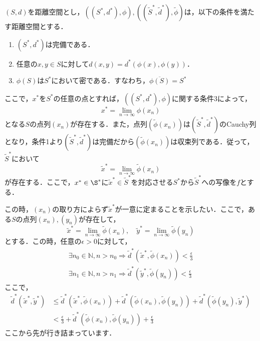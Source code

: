 \documentclass[12pt]{jarticle}
\numberwithin{equation}{section}    %
\numberwithin{figure}{section}      %
\numberwithin{table}{section}      %
\begin{document}
$(S, d)$を距離空間とし，$((S^{\ast}, d^{\ast}), \phi), ((\tilde{S}^{\ast}, \tilde{d}^{\ast}), \tilde{\phi})$は，以下の条件を満たす距離空間とする．
\begin{enumerate}
    \item $(S^{\ast}, d^{\ast})$は完備である．
    \item 任意の$x, y \in S$に対して$d(x, y) = d^{\ast}(\phi(x), \phi(y))$．
    \item $\phi(S)$は$S^{\ast}$において密である．すなわち，$\overline{\phi(S)} = S^{\ast}$
\end{enumerate}
ここで，$x^{\ast}$を$S^{\ast}$の任意の点とすれば，$((S^{\ast}, d^{\ast}), \phi)$に関する条件3によって，
\begin{equation}
    x^{\ast} = \lim_{n \to \infty} \phi(x_{n})
\end{equation}
となる$S$の点列$(x_{n})$が存在する．また，点列$(\tilde{\phi}(x_{n}))$は$(\tilde{S}^{\ast}, \tilde{d}^{\ast})$のCauchy列となり，条件1より$(\tilde{S}^{\ast}, \tilde{d}^{\ast})$は完備だから$(\tilde{\phi}(x_{n}))$は収束列である．従って，$\tilde{S}^{\ast}$において
\begin{equation}
    \tilde{x}^{\ast} = \lim_{n \to \infty} \tilde{\phi}(x_{n})
\end{equation}
が存在する．ここで，$x^{\ast} \in \S^{\ast}$に$\tilde{x}^{\ast} \in \tilde{S}^{\ast}$を対応させる$S^{\ast}$から$\tilde{S}^{\ast}$への写像を$f$とする．

この時，$(x_{n})$の取り方によらず$\tilde{x}^{\ast}$が一意に定まることを示したい．ここで，ある$S$の点列$(x_{n}), (y_{n})$が存在して，
\begin{equation}
    \tilde{x}^{\ast} = \lim_{n \to \infty} \tilde{\phi}(x_{n}), \quad \tilde{y}^{\ast} = \lim_{n \to \infty} \tilde{\phi}(y_{n})
\end{equation}
とする．この時，任意の$\epsilon > 0$に対して，
\begin{gather}
    \exists n_{0} \in \mathbb{N}, n > n_{0} \Rightarrow \tilde{d}^{\ast}(\tilde{x}^{\ast}, \tilde{\phi}(x_{n})) < \frac{\epsilon}{3} \\
    \exists n_{1} \in \mathbb{N}, n > n_{1} \Rightarrow \tilde{d}^{\ast}(\tilde{y}^{\ast}, \tilde{\phi}(y_{n})) < \frac{\epsilon}{3}
\end{gather}
ここで，
\begin{align}
    \tilde{d}^{\ast}(\tilde{x}^{\ast}, \tilde{y}^{\ast}) & \le \tilde{d}^{\ast}(\tilde{x}^{\ast}, \tilde{\phi}(x_{n})) + \tilde{d}^{\ast}(\tilde{\phi}(x_{n}), \tilde{\phi}(y_{n})) + \tilde{d}^{\ast}(\tilde{\phi}(y_{n}), \tilde{y}^{\ast}) \\
                                                         & < \frac{\epsilon}{3} + \tilde{d}^{\ast}(\tilde{\phi}(x_{n}), \tilde{\phi}(y_{n})) + \frac{\epsilon}{3}
\end{align}
ここから先が行き詰まっています．
\end{document}
